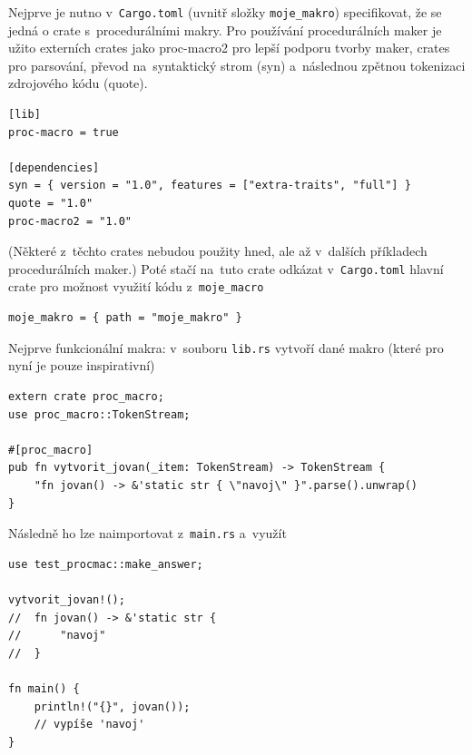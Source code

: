 \documentclass[a4paper, 12pt, twoside]{article} %
\begin{document}
			Nejprve je nutno v~\texttt{Cargo.toml} (uvnitř složky \texttt{moje\_makro}) specifikovat, že se jedná o crate s~procedurálními makry. Pro používání procedurálních maker je užito externích crates jako proc-macro2 pro lepší podporu tvorby maker, crates pro parsování, převod na~syntaktický strom (syn) a~následnou zpětnou tokenizaci zdrojového kódu (quote).
			\begin{verbatim}
[lib]
proc-macro = true

[dependencies]
syn = { version = "1.0", features = ["extra-traits", "full"] }
quote = "1.0"
proc-macro2 = "1.0"
			\end{verbatim}
			
			(Některé z~těchto crates nebudou použity hned, ale až v~dalších příkladech procedurálních maker.) Poté stačí na~tuto crate odkázat v~\texttt{Cargo.toml} hlavní crate pro možnost využití kódu z~\texttt{moje\_macro}
			\begin{verbatim}
moje_makro = { path = "moje_makro" }
			\end{verbatim}

			Nejprve funkcionální makra: v~souboru \texttt{lib.rs} vytvoří dané makro (které pro nyní je pouze inspirativní)
				\begin{verbatim}
extern crate proc_macro;
use proc_macro::TokenStream;

#[proc_macro]
pub fn vytvorit_jovan(_item: TokenStream) -> TokenStream {
	"fn jovan() -> &'static str { \"navoj\" }".parse().unwrap()
}
			\end{verbatim}
				
			Následně ho lze naimportovat z~\texttt{main.rs} a~využít
			\begin{verbatim}
use test_procmac::make_answer;

vytvorit_jovan!();
//  fn jovan() -> &'static str {
//      "navoj"
//  }

fn main() {
	println!("{}", jovan());
	// vypíše 'navoj'
}
			\end{verbatim}
			\cite{fcialni_proc}
				
\end{document}
